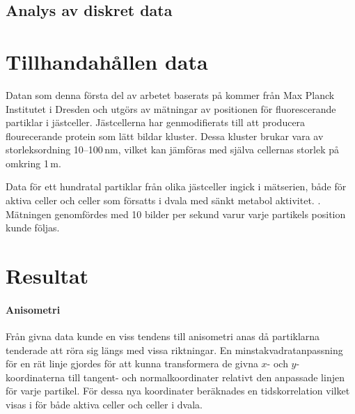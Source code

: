 \subsection{Analys av diskret data}


\section{Tillhandahållen data}
Datan som denna första del av arbetet baserats på kommer från Max
Planck Institutet i Dresden och utgörs av mätningar av positionen för
fluorescerande partiklar i jästceller. Jästcellerna har genmodifierats
till att producera flourecerande protein som lätt bildar
kluster. 
Dessa kluster brukar vara av storleksordning 10--100\,nm,
vilket kan jämföras med själva cellernas storlek på omkring
1\,\micro{}m.

Data för ett hundratal partiklar från olika jästceller ingick i mätserien, både för aktiva celler och celler som försatts i dvala med sänkt metabol aktivitet. . Mätningen genomfördes med 10 bilder per sekund varur varje partikels position kunde följas.


\section{Resultat}

\paragraph{Anisometri} Från givna data kunde en viss tendens till anisometri anas då partiklarna tenderade att röra sig längs med vissa riktningar. En minstakvadratanpassning för en rät linje gjordes för att kunna transformera de givna $x$- och $y$-koordinaterna till tangent- och normalkoordinater relativt den anpassade linjen för varje partikel. För dessa nya koordinater beräknades en tidskorrelation vilket visas i  för både aktiva celler och celler i dvala.

